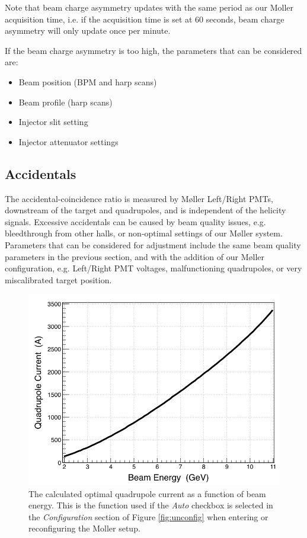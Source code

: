 \documentclass[amsmath,amssymb,notitlepage,12pt]{revtex4}
\begin{document}
Note that beam charge asymmetry updates with the same period as our Moller acquisition time, i.e. if the acquisition time is set at 60 seconds, beam charge asymmetry will only update once per minute.

If the beam charge asymmetry is too high, the parameters that can be considered are:
\begin{itemize}
\vspace{-4mm}\item Beam position (BPM and harp scans)
\vspace{-4mm}\item Beam profile (harp scans)
\vspace{-4mm}\item Injector slit setting
\vspace{-4mm}\item Injector attenuator settings
\end{itemize}

\subsection{Accidentals}
The accidental-coincidence ratio is measured by M{\o}ller Left/Right PMTs, downstream of the target and quadrupoles, and is independent of the helicity signals.  Excessive accidentals can be caused by beam quality issues, e.g. bleedthrough from other halls, or non-optimal settings of our M{\o}ller system.  Parameters that can be considered for adjustment include the same beam quality parameters in the previous section, and with the addition of our M{\o}ller configuration, e.g. Left/Right PMT voltages, malfunctioning quadrupoles, or very miscalibrated target position.

\begin{figure}[htbp]\centering
    \includegraphics[width=14cm]{pics/moller_quad_current}
    \caption{The calculated optimal quadrupole current as a function of beam energy.  This is the function used if the {\em Auto} checkbox is selected in the {\em Configuration} section of Figure \ref{fig:unconfig} when entering or reconfiguring the Moller setup.\label{fig:quadenergy}}
\end{figure}
\end{document}

